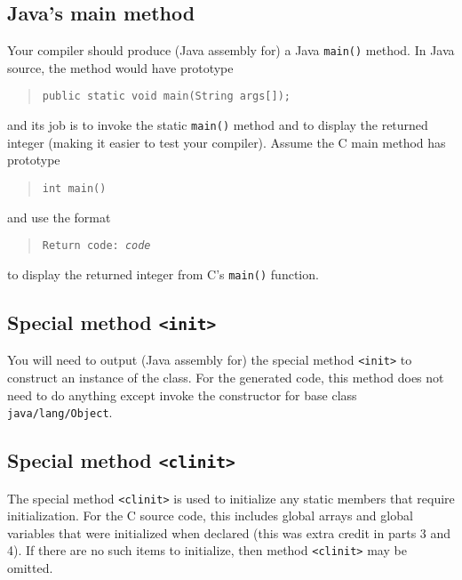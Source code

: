 \documentclass{article}
\newcommand{\parser}{3}
\newcommand{\typecheck}{4}
\begin{document}
\subsection{Java's main method}

Your compiler should produce (Java assembly for) a Java {\tt main()}
method.
In Java source, the method would have prototype
\begin{quote}
  \begin{lstlisting}[numbers=none]
    public static void main(String args[]);
  \end{lstlisting}
\end{quote}
and its job is to invoke the static {\tt main()} method
and to display the returned integer
(making it easier to test your compiler).
Assume the C main method has prototype
\begin{quote}
  \begin{lstlisting}[numbers=none]
    int main()
  \end{lstlisting}
\end{quote}
and use the format
\begin{quote}
  \tt Return code: \emph{code}
\end{quote}
to display the returned integer from C's {\tt main()} function.


\subsection{Special method {\tt <init>}}

You will need to output (Java assembly for) the special method {\tt <init>}
to construct an instance of the class.
For the generated code,
this method does not need to do anything
except invoke the constructor for base class {\tt java/lang/Object}.

\subsection{Special method {\tt <clinit>}}

The special method {\tt <clinit>}
is used to initialize any static members that require initialization.
For the C source code,
this includes global arrays and global variables that were initialized
when declared (this was extra credit in parts \parser{} and \typecheck{}).
If there are no such items to initialize, then method {\tt <clinit>}
may be omitted.
\end{document}
